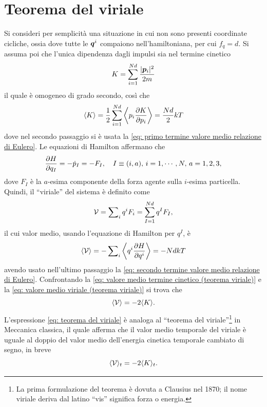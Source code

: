 \section{Teorema del viriale}
Si consideri per semplicità una situazione in cui non sono presenti coordinate cicliche, ossia dove tutte le $\bm{q}^i$ compaiono nell'hamiltoniana, per cui $f_q = d$. Si assuma poi che l'unica dipendenza dagli impulsi sia nel termine cinetico 
\begin{equation}
    K = \sum_{i=1}^{Nd} \frac{|\bm{p}_i|^2}{2m}
\end{equation}
il quale è omogeneo di grado secondo, così che
\begin{equation}
\label{eq: valore medio termine cinetico (teorema viriale)}
    \langle K \rangle = \frac{1}{2} \sum_{i=1}^{Nd} \left\langle p_i \frac{\partial K}{\partial p_i} \right\rangle = \frac{Nd}{2}kT
\end{equation}
dove nel secondo passaggio si è usata la \eqref{eq: primo termine valore medio relazione di Eulero}. Le equazioni di Hamilton affermano che
\begin{equation}
    \frac{\partial H}{\partial q_I} = -\dot{p}_I = -F_I, \quad I \equiv (i,a),\,i=1,\cdots,N,\,a = 1,2,3,
\end{equation}
dove $F_I$ è la $a$-esima componente della forza agente sulla $i$-esima particella. Quindi, il ``viriale'' del sistema è definito come
\begin{equation}
    \mathcal{V} = \sum\nolimits_i q^i F_i = \sum_{I=1}^{Nd} q^I F_I,
\end{equation}
il cui valor medio, usando l'equazione di Hamilton per $q^I$, è
\begin{equation}
\label{eq: valore medio viriale (teorema viriale)}
    \langle \mathcal{V} \rangle = -\sum\nolimits_i \left\langle q^i\frac{\partial H}{\partial q^i} \right\rangle = -NdkT
\end{equation}
avendo usato nell'ultimo passaggio la \eqref{eq: secondo termine valore medio relazione di Eulero}. Confrontando la \eqref{eq: valore medio termine cinetico (teorema viriale)} e la \eqref{eq: valore medio viriale (teorema viriale)} si trova che
\begin{equation}
\label{eq: teorema del viriale}
    \langle \mathcal{V} \rangle = -2\langle K \rangle.
\end{equation}
L'espressione \eqref{eq: teorema del viriale} è analoga al ``teorema del viriale''\footnote{La prima formulazione del teorema è dovuta a Clausius nel 1870; il nome viriale deriva dal latino ``vis'' significa forza o energia.} in Meccanica classica, il quale afferma che il valor medio temporale del viriale è uguale al doppio del valor medio dell'energia cinetica temporale cambiato di segno, in breve
\begin{equation}    
    \langle \mathcal{V} \rangle_t = -2\langle K \rangle_t.
\end{equation}

